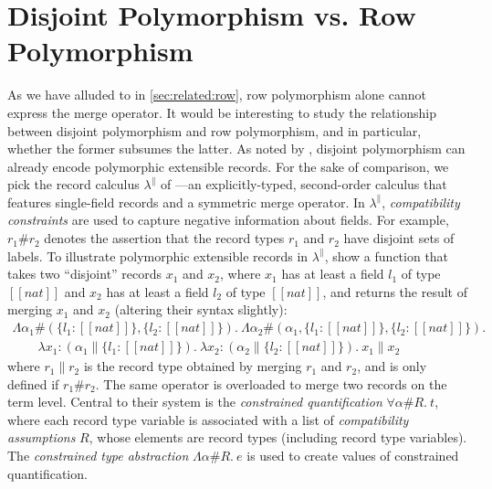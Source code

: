 \section{Disjoint Polymorphism vs. Row Polymorphism}
\label{sec:future:row}

As we have alluded to in \cref{sec:related:row}, row polymorphism alone cannot express
the merge operator. It would be interesting to study the
relationship between disjoint polymorphism and row polymorphism, and in
particular, whether the former subsumes the latter. As noted by
\citet{alpuimdisjoint}, disjoint polymorphism can already encode polymorphic
extensible records. For the sake of comparison, we pick the record calculus
$\lambda^{\|}$ of \citet{Harper:1991:RCB:99583.99603}---an explicitly-typed,
second-order calculus that features single-field records and a symmetric merge
operator. In $\lambda^{\|}$, \emph{compatibility constraints} are used to
capture negative information about fields. For example, $r_1 \# r_2 $ denotes the
assertion that the record types $r_1$ and $r_2$ have disjoint sets of labels. To
illustrate polymorphic extensible records in $\lambda^{\|}$,
\citeauthor{Harper:1991:RCB:99583.99603} show a function that takes two
``disjoint'' records $x_1$ and $x_2$, where $x_1$ has at least a field $l_1$ of
type $[[nat]]$ and $x_2$ has at least a field $l_2$ of type $[[nat]]$, and
returns the result of merging $x_1$ and $x_2$ (altering their syntax slightly):
\begin{align*}
  \Lambda \alpha_1 \# (\{ l_1 : [[nat]] \}, \{ l_2 : [[nat]] \}) .\  \Lambda \alpha_2 \# (\alpha_1 , \{l_1 : [[nat]]\} , \{ l_2 : [[nat]]   \}) . \\
  \qquad \lambda x_1 : (\alpha_1 \| \{ l_1 : [[nat]] \}) .\  \lambda x_2 : (\alpha_2 \| \{ l_2 : [[nat]] \}) .\ x_1 \| x_2
\end{align*}
where $r_1 \| r_2$ is the record type obtained by merging $r_1$ and $r_2$, and
is only defined if $r_1 \# r_2$. The same operator is overloaded to merge two
records on the term level. Central to their system is the \emph{constrained
  quantification} $\forall \alpha \# R .\ t $, where each record type variable is
associated with a list of \emph{compatibility assumptions} $R$, whose elements
are record types (including record type variables). The \emph{constrained type abstraction} $\Lambda \alpha \# R.\ e$
is used to create values of constrained quantification.


